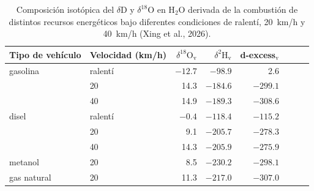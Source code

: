 \begin{table}[htbp]
\centering
\caption{Composición isotópica del $\delta\mathrm{D}$ y $\delta^{18}\mathrm{O}$ 
en H$_2$O derivada de la combustión de distintos recursos energéticos bajo diferentes 
condiciones de ralentí, 20~km/h y 40~km/h (Xing et al., 2026).}
\label{tab:isotopic_vehicle_exhaust}
\begin{tabular}{llrrrrrr}
\toprule
Tipo de vehículo & Velocidad (km/h) & $\delta^{18}\mathrm{O}_\mathrm{v}$ & $\delta^{2}\mathrm{H}_\mathrm{v}$ & d-excess$_\mathrm{v}$ \\
\midrule
gasolina    & ralentí & $-12.7$ &   $-98.9$   & 2.6   \\
            & 20      & 14.3    &   $-184.6$  & $-299.1$ \\
            & 40      & 14.9    &   $-189.3$  & $-308.6$ \\
\addlinespace
disel      & ralentí  & $-0.4$  &   $-118.4$  & $-115.2$ \\
            & 20      & 9.1     &   $-205.7$  & $-278.3$ \\
            & 40      & 14.3    &   $-205.9$  & $-275.9$ \\
\addlinespace
metanol    & 20       & 8.5     &   $-230.2$  & $-298.1$ \\
gas natural & 20      & 11.3    &   $-217.0$  & $-307.0$ \\
\bottomrule
\end{tabular}

\end{table}

